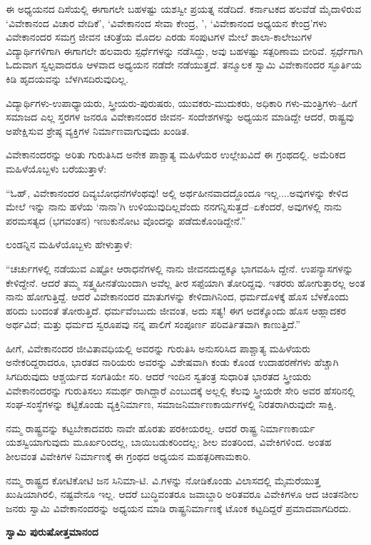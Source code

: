 ಈ ಅಧ್ಯಯನದ ದಿಸೆಯಲ್ಲಿ ಈಗಾಗಲೇ ಬಹಳಷ್ಟು ಯಶಸ್ವೀ ಪ್ರಯತ್ನ ನಡೆದಿದೆ. ಕರ್ನಾಟಕದ ಹಲವೆಡೆ ಮೈದಾಳಿರುವ ‘ವಿವೇಕಾನಂದ ವಿಚಾರ ವೇದಿಕೆ’, ‘ವಿವೇಕಾನಂದ ಸೇವಾ ಕೇಂದ್ರ, ’, ‘ವಿವೇಕಾನಂದ ಅಧ್ಯಯನ ಕೇಂದ್ರ’ಗಳು ವಿವೇಕಾನಂದರ ಸಮಗ್ರ ಜೀವನ ಚರಿತ್ರೆಯ ಮೊದಲ ಎರಡು ಸಂಪುಟಗಳ ಮೇಲೆ ಶಾಲಾ-ಕಾಲೇಜುಗಳ ವಿದ್ಯಾರ್ಥಿಗಳಿಗಾಗಿ ಈಗಾಗಲೇ ಹಲವಾರು ಸ್ಪರ್ಧೆಗಳನ್ನು ನಡೆಸಿದ್ದು, ಅವು ಬಹಳಷ್ಟು ಸತ್ಪರಿಣಾಮ ಬೀರಿವೆ. ಸ್ಪರ್ಧೆಗಾಗಿ ಓದುವಾಗ ಸ್ವಲ್ಪವಾದರೂ ಆಳವಾದ ಅಧ್ಯಯನ ನಡೆದೇ ನಡೆಯುತ್ತದೆ. ತನ್ಮೂಲಕ ಸ್ವಾಮಿ ವಿವೇಕಾನಂದರ ಸ್ಫೂರ್ತಿಯ ಕಿಡಿ ಹೃದಯವನ್ನು ಬೆಳಗಿಸದಿರುವುದಿಲ್ಲ.

ವಿದ್ಯಾರ್ಥಿಗಳು-ಉಪಾಧ್ಯಾಯರು, ಸ್ತ್ರೀಯರು-ಪುರುಷರು, ಯುವಕರು-ಮುದುಕರು, ಅಧಿಕಾರಿ ಗಳು-ಮಂತ್ರಿಗಳು–ಹೀಗೆ ಸಮಾಜದ ಎಲ್ಲ ಸ್ತರಗಳ ಜನರೂ ವಿವೇಕಾನಂದರ ಜೀವನ- ಸಂದೇಶಗಳನ್ನು ಅಧ್ಯಯನ ಮಾಡಿದ್ದೇ ಆದರೆ, ರಾಷ್ಟ್ರವು ಅಪೇಕ್ಷಿಸುವ ಶ್ರೇಷ್ಠ ವ್ಯಕ್ತಿಗಳ ನಿರ್ಮಾಣವಾಗುವುದು ಖಂಡಿತ.

ವಿವೇಕಾನಂದರನ್ನು ಅರಿತು ಗುರುತಿಸಿದ ಅನೇಕ ಪಾಶ್ಚಾತ್ಯ ಮಹಿಳೆಯರ ಉಲ್ಲೇಖವಿದೆ ಈ ಗ್ರಂಥದಲ್ಲಿ. ಅಮೆರಿಕದ ಮಹಿಳೆಯೊಬ್ಬಳು ಬರೆಯುತ್ತಾಳೆ:

“ಓಹ್, ವಿವೇಕಾನಂದರ ದಿವ್ಯಬೋಧನೆಗಳೆಂಥವು! ಅಲ್ಲಿ ಅರ್ಥಹೀನವಾದದ್ದೊಂದೂ ಇಲ್ಲ....ಅವುಗಳನ್ನು ಕೇಳಿದ ಮೇಲೆ ಇನ್ನು ನಾನು ಹಳೆಯ ‘ನಾನಾ’ಗಿ ಉಳಿಯುವುದಿಲ್ಲವೆಂದು ನನಗನ್ನಿಸುತ್ತದೆ–ಏಕೆಂದರೆ, ಅವುಗಳಲ್ಲಿ ನಾನು ಪರಮಸತ್ಯದ (ಭಗವಂತನ) ಇಣುಕುನೋಟ ವೊಂದನ್ನು ಪಡೆದುಕೊಂಡಿದ್ದೇನೆ.”

ಲಂಡನ್ನಿನ ಮಹಿಳೆಯೊಬ್ಬಳು ಹೇಳುತ್ತಾಳೆ:

“ಚರ್ಚುಗಳಲ್ಲಿ ನಡೆಯುವ ಎಷ್ಟೋ ಆರಾಧನೆಗಳಲ್ಲಿ ನಾನು ಜೀವನದುದ್ದಕ್ಕೂ ಭಾಗವಹಿಸಿ ದ್ದೇನೆ. ಉಪನ್ಯಾಸಗಳನ್ನು ಕೇಳಿದ್ದೇನೆ. ಆದರೆ ತಮ್ಮ ಸತ್ತ್ವಹೀನತೆಯಿಂದಾಗಿ ಅವೆಲ್ಲ ತೀರ ಸಪ್ಪೆಯಾಗಿ ತೋರಿದ್ದವು. ಇತರರು ಹೋಗುತ್ತಾರಲ್ಲ ಅಂತ ನಾನು ಹೋಗುತ್ತಿದ್ದೆ. ಆದರೆ ವಿವೇಕಾನಂದರ ಮಾತುಗಳನ್ನು ಕೇಳಿದಾಗಿನಿಂದ, ಧರ್ಮದೊಳಕ್ಕೆ ಹೊಸ ಬೆಳಕೊಂದು ಹರಿದು ಬಂದಂತೆ ತೋರುತ್ತಿದೆ. ಧರ್ಮವೆಂಬುದು ಜೀವಂತ, ಅದು ಸತ್ಯ! ಈಗ ಅದಕ್ಕೊಂದು ಹೊಸ ಆಹ್ಲಾದಕರ ಅರ್ಥವಿದೆ; ಮತ್ತು ಧರ್ಮದ ಸ್ವರೂಪವು ನನ್ನ ಪಾಲಿಗೆ ಸಂಪೂರ್ಣ ಪರಿವರ್ತಿತವಾಗಿ ಕಾಣುತ್ತಿದೆ.”

ಹೀಗೆ, ವಿವೇಕಾನಂದರ ಜೀವಿತಾವಧಿಯಲ್ಲಿ ಅವರನ್ನು ಗುರುತಿಸಿ ಅನುಸರಿಸಿದ ಪಾಶ್ಚಾತ್ಯ ಮಹಿಳೆಯರು ಅನೇಕರಿದ್ದರಾದರೂ, ಭಾರತದ ನಾರಿಯರು ಅವರನ್ನು ವಿಶೇಷವಾಗಿ ಕಂಡು ಕೊಂಡ ಉದಾಹರಣೆಗಳು ಹೆಚ್ಚಾಗಿ ಸಿಗದಿರುವುದು ಆಶ್ಚರ್ಯದ ಸಂಗತಿಯೇ ಸರಿ. ಆದರೆ ಇಂದಿನ ಸ್ವತಂತ್ರ ಸುಧಾರಿತ ಭಾರತದ ಸ್ತ್ರೀಯರು ವಿವೇಕಾನಂದರನ್ನು ಗುರುತಿಸಲು ಸಮರ್ಥ ರಾಗಿದ್ದಾರೆ ಎಂಬುದಕ್ಕೆ ಅಲ್ಲಲ್ಲಿ ಕೆಲವು ಸ್ತ್ರೀಯರೇ ಸೇರಿ ಅವರ ಹೆಸರಿನಲ್ಲಿ ಸಂಘ-ಸಂಸ್ಥೆಗಳನ್ನು ಕಟ್ಟಿಕೊಂಡು ವ್ಯಕ್ತಿನಿರ್ಮಾಣ, ಸಮಾಜನಿರ್ಮಾಣಕಾರ್ಯಗಳಲ್ಲಿ ನಿರತರಾಗಿರುವುದೇ ಸಾಕ್ಷಿ.

ನಮ್ಮ ರಾಷ್ಟ್ರವನ್ನು ಕಟ್ಟಬೇಕಾದವರು ನಾವೇ ಹೊರತು ಪರಕೀಯರಲ್ಲ. ಆದರೆ ರಾಷ್ಟ್ರ ನಿರ್ಮಾಣಕಾರ್ಯ ಯಶಸ್ವಿಯಾಗುವುದು ಮೂರ್ಖರಿಂದಲ್ಲ, ಬಾಯಿಬಡುಕರಿಂದಲ್ಲ; ಶೀಲ ವಂತರಿಂದ, ವಿವೇಕಿಗಳಿಂದ. ಅಂತಹ ಶೀಲವಂತ ವಿವೇಕಿಗಳ ನಿರ್ಮಾಣಕ್ಕೆ ಈ ಗ್ರಂಥದ ಅಧ್ಯಯನ ಮಹತ್ಪರಿಣಾಮಕಾರಿ.

ನಮ್ಮ ರಾಷ್ಟ್ರದ ಕೋಟಿಕೋಟಿ ಜನ ಸಿನಿಮಾ-ಟಿ. ವಿ.ಗಳನ್ನು ನೋಡಿಕೊಂಡು ವಿಲಾಸದಲ್ಲಿ ಮೈಮರೆಯುತ್ತ ಖುಷಿಯಾಗಿರಲಿ, ನಷ್ಟವೇನೂ ಇಲ್ಲ. ಆದರೆ ಬುದ್ಧಿವಂತರೂ ಜವಾಬ್ದಾರಿ ಅರಿತವರೂ ವಿವೇಕಿಗಳೂ ಆದ ಚಿಂತನಶೀಲ ಜನರು ಸ್ವಾಮಿ ವಿವೇಕಾನಂದರನ್ನು ಅಧ್ಯಯನ ಮಾಡಿ ರಾಷ್ಟ್ರನಿರ್ಮಾಣಕ್ಕೆ ಟೊಂಕ ಕಟ್ಟದಿದ್ದರೆ ಪ್ರಮಾದವಾಗದಿರದು.

\begin{flushright}
\textbf{ಸ್ವಾಮಿ ಪುರುಷೋತ್ತಮಾನಂದ}
\end{flushright}

